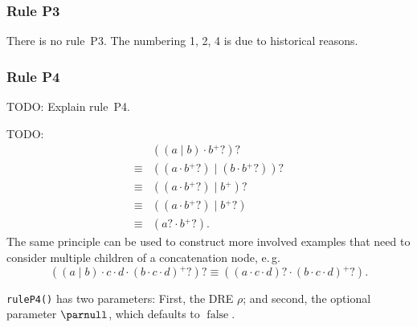 \documentclass[a4paper,11pt, svgnames,titlepage]{article}
\newcommand{\rxp}{{^\mathtt{+}}}
\newcommand{\rxo}{\mathtt{?}}
\newcommand{\rxc}{\cdot}
\DeclareMathOperator{\ror}{\mathtt{|}}
\newcommand{\false}{\ensuremath{\operatorname{false}}\xspace}
\begin{document}
\subsubsection{Rule P3}
There is no rule~P3. The numbering 1, 2, 4 is due to historical reasons.
\subsubsection{Rule P4}


TODO: Explain rule~P4.

TODO:
\begin{align*}
		& ((a \ror b) \rxc b\rxp\rxo)\rxo\\
\equiv	& ((a \rxc b\rxp\rxo) \ror (b \rxc b\rxp\rxo))\rxo\\
\equiv	& ((a \rxc b\rxp\rxo) \ror b\rxp)\rxo\\
\equiv	& ((a \rxc b\rxp\rxo) \ror b\rxp\rxo)\\
\equiv	& (a\rxo \rxc b\rxp\rxo). 
\end{align*}
The same principle can be used to construct more involved examples that need to consider multiple children of a concatenation node, e.\,g.
\begin{equation*}
	((a \ror b) \rxc c \rxc d \rxc (b \rxc c \rxc d)\rxp\rxo)\rxo \equiv 
	((a \rxc c \rxc d)\rxo \rxc (b \rxc c \rxc d)\rxp\rxo).
\end{equation*}

\texttt{ruleP4()} has two parameters: First, the DRE $\rho$; and second, the optional parameter $\parnull$, which defaults to $\false$.
\end{document}
